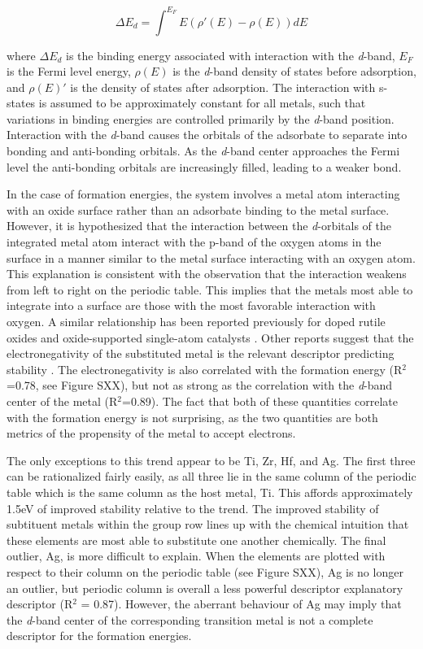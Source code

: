 \begin{equation}
    \Delta E_d = \int^{E_F} E(\rho'(E) - \rho(E))dE
    \label{eq:d_band}
\end{equation}

where $\Delta E_d$ is the binding energy associated with interaction with the \textit{d}-band, $E_F$ is the Fermi level energy, $\rho(E)$ is the \textit{d}-band density of states before adsorption, and $\rho(E)'$ is the density of states after adsorption. The interaction with s- states is assumed to be approximately constant for all metals, such that variations in binding energies are controlled primarily by the \textit{d}-band position. Interaction with the \textit{d}-band causes the orbitals of the adsorbate to separate into bonding and anti-bonding orbitals. As the \textit{d}-band center approaches the Fermi level the anti-bonding orbitals are increasingly filled, leading to a weaker bond.

In the case of formation energies, the system involves a metal atom interacting with an oxide surface rather than an adsorbate binding to the metal surface. However, it is hypothesized that the interaction between the \textit{d}-orbitals of the integrated metal atom interact with the p-band of the oxygen atoms in the surface in a manner similar to the metal surface interacting with an oxygen atom. This explanation is consistent with the observation that the interaction weakens from left to right on the periodic table. This implies that the metals most able to integrate into a surface are those with the most favorable interaction with oxygen. A similar relationship has been reported previously for doped rutile oxides \cite{Xu_2015} and oxide-supported single-atom catalysts \cite{O_Connor_2018}. Other reports suggest that the electronegativity of the substituted metal is the relevant descriptor predicting stability \cite{Garc_a_Mota_2011}. The electronegativity is also correlated with the formation energy (R$^2$=0.78, see Figure SXX), but not as strong as the correlation with the \textit{d}-band center of the metal (R$^2$=0.89). The fact that both of these quantities correlate with the formation energy is not surprising, as the two quantities are both metrics of the propensity of the metal to accept electrons.


The only exceptions to this trend appear to be Ti, Zr, Hf, and Ag. The first three can be rationalized fairly easily, as all three lie in the same column of the periodic table which is the same column as the host metal, Ti. This affords approximately 1.5eV of improved stability relative to the trend. The improved stability of subtituent metals within the group row lines up with the chemical intuition that these elements are most able to substitute one another chemically. The final outlier, Ag, is more difficult to explain. When the elements are plotted with respect to their column on the periodic table (see Figure SXX), Ag is no longer an outlier, but periodic column is overall a less powerful descriptor explanatory descriptor (R$^2$ = 0.87). However, the aberrant behaviour of Ag may imply that the \textit{d}-band center of the corresponding transition metal is not a complete descriptor for the formation energies.

